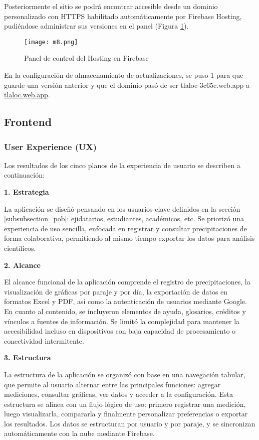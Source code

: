 Posteriormente el sitio se podrá encontrar accesible desde un dominio personalizado con HTTPS habilitado automáticamente por Firebase Hosting, pudiéndose administrar sus versiones en el panel (Figura \ref{m8}).
\begin{figure}[ht]
\centering
  \texttt{[image: m8.png]}
  \caption{Panel de control del Hosting en Firebase}
  \label{m8}
\end{figure}
En la configuración de almacenamiento de actualizaciones, se puso 1 para que guarde una versión anterior y que el dominio pasó de ser tlaloc-3c65c.web.app a \url{tlaloc.web.app}.

\newpage
\subsection{Frontend}
\subsubsection{User Experience (UX)}
Los resultados de los cinco planos de la experiencia de usuario se describen a continuación:


\textbf{1. Estrategia}

La aplicación se diseñó pensando en los usuarios clave definidos en la sección \ref{subsubsection_pob}: ejidatarios, estudiantes, académicos, etc. Se priorizó una experiencia de uso sencilla, enfocada en registrar y consultar precipitaciones de forma colaborativa, permitiendo al mismo tiempo exportar los datos para análisis científicos.

\textbf{2. Alcance}

El alcance funcional de la aplicación comprende el registro de precipitaciones, la visualización de gráficas por paraje y por día, la exportación de datos en formatos Excel y PDF, así como la autenticación de usuarios mediante Google. En cuanto al contenido, se incluyeron elementos de ayuda, glosarios, créditos y vínculos a fuentes de información. Se limitó la complejidad para mantener la accesibilidad incluso en dispositivos con baja capacidad de procesamiento o conectividad intermitente.

\textbf{3. Estructura}

La estructura de la aplicación se organizó con base en una navegación tabular, que permite al usuario alternar entre las principales funciones: agregar mediciones, consultar gráficas, ver datos y acceder a la configuración. Esta estructura se alinea con un flujo lógico de uso: primero registrar una medición, luego visualizarla, compararla y finalmente personalizar preferencias o exportar los resultados. Los datos se estructuran por usuario y por paraje, y se sincronizan automáticamente con la nube mediante Firebase.

